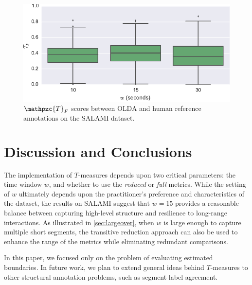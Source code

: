 \documentclass{article}
\def\shag{\ensuremath{\mathpzc{T}}}
\begin{document}
\begin{figure}[t]
    \centering
    \includegraphics[width=\columnwidth]{figs/salami-olda-stats}
    \caption{$\shag_F$ scores between OLDA and human reference annotations on the SALAMI dataset.}\label{fig:salami-olda-stats}
\end{figure}



\section{Discussion and Conclusions}\label{sec:conclusions}

The implementation of $T$-measures depends upon two critical parameters: the time window
$w$, and whether to use the \emph{reduced} or \emph{full} metrics.  While the setting of
$w$ ultimately depends upon the practitioner's preference and characteristics of the
dataset, the results on SALAMI suggest that $w=15$ provides a reasonable balance
between capturing high-level structure and resilience to long-range interactions.
As illustrated in \cref{sec:largeover}, when $w$ is large enough to capture multiple short
segments, the transitive reduction approach can also be used to enhance the range
of the metrics while eliminating redundant comparisons.

In this paper, we focused only on the problem of evaluating estimated boundaries.
In future work, we plan to extend general ideas behind $T$-measures to other structural 
annotation problems, such as segment label agreement.


\end{document}
